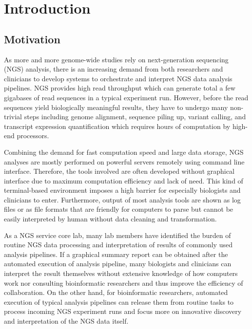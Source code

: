 \chapter{Introduction}
\label{c:intro}

\section{Motivation}
\label{s:motivation}

%
%

As more and more genome-wide studies rely on next-generation sequencing (NGS)
analysis, there is an increasing demand from both researchers and clinicians to
develop systems to orchestrate and interpret NGS data analysis pipelines. NGS
provides high read throughput which can generate total a few gigabases of read
sequences in a typical experiment run. However, before the read sequences yield
biologically meaningful results, they have to undergo many non-trivial steps
including genome alignment, sequence piling up, variant calling, and transcript
expression quantification which requires hours of computation by high-end
processors.

Combining the demand for fast computation speed and large data storage, NGS
analyses are mostly performed on powerful servers remotely using command line
interface. Therefore, the tools involved are often developed without graphical
interface due to maximum computation efficiency and lack of need. This kind of
terminal-based environment imposes a high barrier for especially biologists and
clinicians to enter. Furthermore, output of most analysis tools are shown as
log files or as file formats that are friendly for computers to parse but
cannot be easily interpreted by human without data cleaning and transformation.

As a NGS service core lab, many lab members have identified the burden of
routine NGS data processing and interpretation of results of commonly used
analysis pipelines. If a graphical summary report can be obtained after the
automated execution of analysis pipeline, many biologists and clinicians can
interpret the result themselves without extensive knowledge of how computers
work nor consulting bioinformatic researchers and thus improve the efficiency
of collaboration. On the other hand, for bioinformatic researchers, automated
execution of typical analysis pipelines can release them from routine tasks to
process incoming NGS experiment runs and focus more on innovative discovery and
interpretation of the NGS data itself.

